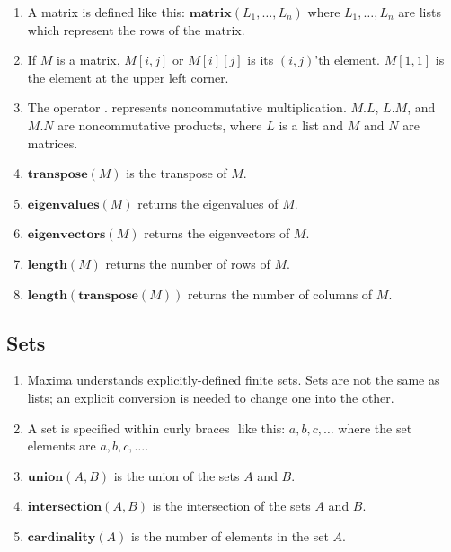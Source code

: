 \documentclass[12pt]{article}
\begin{document}
\begin{enumerate}

\item A matrix is defined like this: $\mathbf{matrix}(L_1, \ldots, L_n)$
    where $L_1, \ldots, L_n$ are lists which represent the rows of the matrix.
    
\item If $M$ is a matrix, $M[i, j]$ or $M[i][j]$ is its $(i, j)$'th element.
    $M[1,1]$ is the element at the upper left corner.

\item The operator $\mathbf{.}$ represents noncommutative multiplication.
    $M . L$, $L . M$, and $M . N$ are noncommutative products,
    where $L$ is a list and $M$ and $N$ are matrices.


\item $\mathbf{transpose}(M)$ is the transpose of $M$.

\item $\mathbf{eigenvalues}(M)$ returns the eigenvalues of $M$.

\item $\mathbf{eigenvectors}(M)$ returns the eigenvectors of $M$.

\item $\mathbf{length}(M)$ returns the number of rows of $M$.

\item $\mathbf{length}(\mathbf{transpose}(M))$ returns the number of columns of $M$.

\end{enumerate}

\subsection{Sets}

\begin{enumerate}

\item Maxima understands explicitly-defined finite sets.
    Sets are not the same as lists; an explicit conversion is needed to change one into the other.
    
\item A set is specified within curly braces ${ }$ like this:
    ${a, b, c, \ldots}$ where the set elements are $a, b, c, \ldots$.

\item $\mathbf{union} (A, B)$ is the union of the sets $A$ and $B$.

\item $\mathbf{intersection} (A, B)$ is the intersection of the sets $A$ and $B$.

\item $\mathbf{cardinality} (A)$ is the number of elements in the set $A$.

\end{enumerate}
\end{document}
